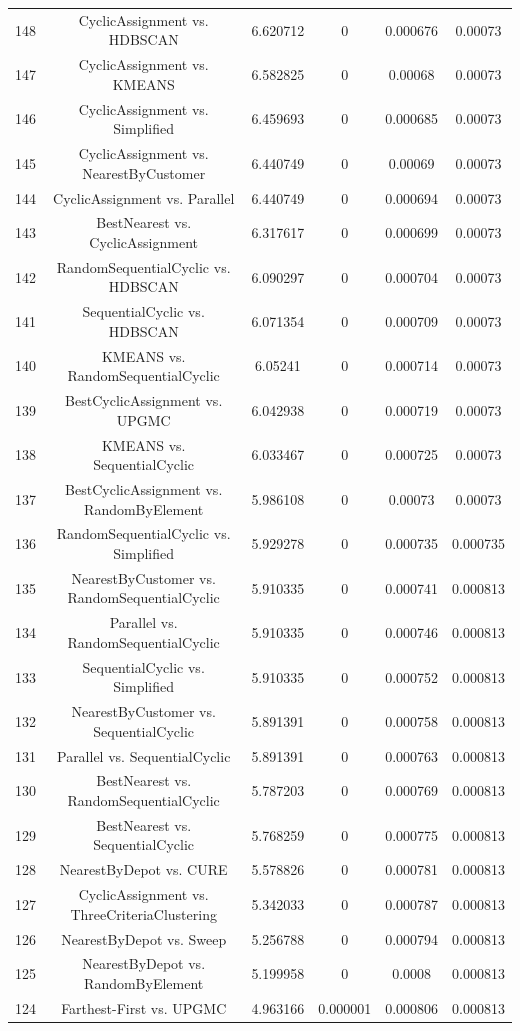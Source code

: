 \documentclass[a4paper,10pt]{article}
\begin{document}
\begin{landscape}
\begin{table}[!htp]
\begin{tabular}{cccccc}
148&CyclicAssignment vs. HDBSCAN&6.620712&0&0.000676&0.00073\\
147&CyclicAssignment vs. KMEANS&6.582825&0&0.00068&0.00073\\
146&CyclicAssignment vs. Simplified&6.459693&0&0.000685&0.00073\\
145&CyclicAssignment vs. NearestByCustomer&6.440749&0&0.00069&0.00073\\
144&CyclicAssignment vs. Parallel&6.440749&0&0.000694&0.00073\\
143&BestNearest vs. CyclicAssignment&6.317617&0&0.000699&0.00073\\
142&RandomSequentialCyclic vs. HDBSCAN&6.090297&0&0.000704&0.00073\\
141&SequentialCyclic vs. HDBSCAN&6.071354&0&0.000709&0.00073\\
140&KMEANS vs. RandomSequentialCyclic&6.05241&0&0.000714&0.00073\\
139&BestCyclicAssignment vs. UPGMC&6.042938&0&0.000719&0.00073\\
138&KMEANS vs. SequentialCyclic&6.033467&0&0.000725&0.00073\\
137&BestCyclicAssignment vs. RandomByElement&5.986108&0&0.00073&0.00073\\
136&RandomSequentialCyclic vs. Simplified&5.929278&0&0.000735&0.000735\\
135&NearestByCustomer vs. RandomSequentialCyclic&5.910335&0&0.000741&0.000813\\
134&Parallel vs. RandomSequentialCyclic&5.910335&0&0.000746&0.000813\\
133&SequentialCyclic vs. Simplified&5.910335&0&0.000752&0.000813\\
132&NearestByCustomer vs. SequentialCyclic&5.891391&0&0.000758&0.000813\\
131&Parallel vs. SequentialCyclic&5.891391&0&0.000763&0.000813\\
130&BestNearest vs. RandomSequentialCyclic&5.787203&0&0.000769&0.000813\\
129&BestNearest vs. SequentialCyclic&5.768259&0&0.000775&0.000813\\
128&NearestByDepot vs. CURE&5.578826&0&0.000781&0.000813\\
127&CyclicAssignment vs. ThreeCriteriaClustering&5.342033&0&0.000787&0.000813\\
126&NearestByDepot vs. Sweep&5.256788&0&0.000794&0.000813\\
125&NearestByDepot vs. RandomByElement&5.199958&0&0.0008&0.000813\\
124&Farthest-First vs. UPGMC&4.963166&0.000001&0.000806&0.000813\\

\end{tabular}
\end{table}
\end{landscape}
\end{document}
